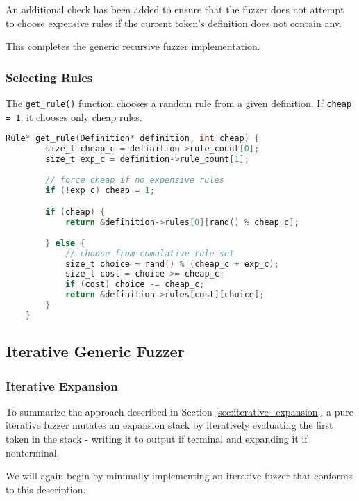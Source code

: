 \documentclass[8pt, twoside]{extarticle}
\begin{document}
An additional check has been added to ensure that the fuzzer does not attempt to choose expensive rules if the current token’s definition does not contain any. 

This completes the generic recursive fuzzer implementation.

\subsubsection{Selecting Rules} \label{sec:selrule}

The \verb|get_rule()| function chooses a random rule from a given definition. If \verb|cheap = 1|, it chooses only cheap rules.

\begin{lstlisting}[gobble=2, language=C, caption={Get rule function}] 
	Rule* get_rule(Definition* definition, int cheap) {
		size_t cheap_c = definition->rule_count[0];
		size_t exp_c = definition->rule_count[1];
		
		// force cheap if no expensive rules
		if (!exp_c) cheap = 1;

		if (cheap) {
			return &definition->rules[0][rand() % cheap_c];
		
		} else {
			// choose from cumulative rule set
			size_t choice = rand() % (cheap_c + exp_c);
			size_t cost = choice >= cheap_c;
			if (cost) choice -= cheap_c;
			return &definition->rules[cost][choice];
		}
	}
\end{lstlisting}

\subsection{Iterative Generic Fuzzer}

\subsubsection{Iterative Expansion}

To summarize the approach described in Section \ref{sec:iterative_expansion}, a pure iterative fuzzer mutates an expansion stack by iteratively evaluating the first token in the stack - writing it to output if terminal and expanding it if nonterminal.

We will again begin by minimally implementing an iterative fuzzer that conforms to this description.
\end{document}
